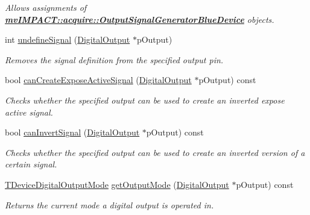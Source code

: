 \begin{DoxyCompactItemize}
\begin{DoxyCompactList}\small\item\em Allows assignments of {\bfseries \hyperlink{classmv_i_m_p_a_c_t_1_1acquire_1_1_output_signal_generator_blue_device}{mv\+I\+M\+P\+A\+C\+T\+::acquire\+::\+Output\+Signal\+Generator\+Blue\+Device}} objects. \end{DoxyCompactList}\item 
int \hyperlink{classmv_i_m_p_a_c_t_1_1acquire_1_1_output_signal_generator_blue_device_aeca806ca24502add66bde8fb3e8bb15b}{undefine\+Signal} (\hyperlink{classmv_i_m_p_a_c_t_1_1acquire_1_1_digital_output}{Digital\+Output} $\ast$p\+Output)
\begin{DoxyCompactList}\small\item\em Removes the signal definition from the specified output pin. \end{DoxyCompactList}\item 
bool \hyperlink{classmv_i_m_p_a_c_t_1_1acquire_1_1_output_signal_generator_blue_device_ac6dfdf5a4bc3f8c2e0096378a84fc4da}{can\+Create\+Expose\+Active\+Signal} (\hyperlink{classmv_i_m_p_a_c_t_1_1acquire_1_1_digital_output}{Digital\+Output} $\ast$p\+Output) const 
\begin{DoxyCompactList}\small\item\em Checks whether the specified output can be used to create an inverted expose active signal. \end{DoxyCompactList}\item 
bool \hyperlink{classmv_i_m_p_a_c_t_1_1acquire_1_1_output_signal_generator_blue_device_a2627240e4de2d8d1eec3b1624a413196}{can\+Invert\+Signal} (\hyperlink{classmv_i_m_p_a_c_t_1_1acquire_1_1_digital_output}{Digital\+Output} $\ast$p\+Output) const 
\begin{DoxyCompactList}\small\item\em Checks whether the specified output can be used to create an inverted version of a certain signal. \end{DoxyCompactList}\item 
\hyperlink{group___device_specific_interface_gad65061e17a93ca4a79e5b75d8ca78a27}{T\+Device\+Digital\+Output\+Mode} \hyperlink{classmv_i_m_p_a_c_t_1_1acquire_1_1_output_signal_generator_blue_device_aa4e31ae4a368bfb2bea08aa47871858d}{get\+Output\+Mode} (\hyperlink{classmv_i_m_p_a_c_t_1_1acquire_1_1_digital_output}{Digital\+Output} $\ast$p\+Output) const 
\begin{DoxyCompactList}\small\item\em Returns the current mode a digital output is operated in. \end{DoxyCompactList}\item 

\end{DoxyCompactItemize}
